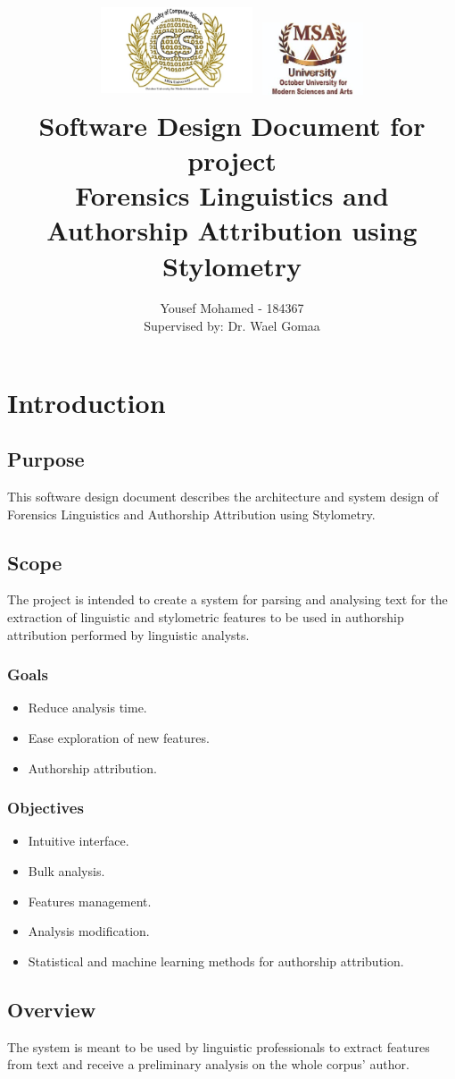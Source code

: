 \documentclass[12pt]{article}
\title{
{\includegraphics[width=4.5cm, height=3cm]{Images/CSLogo.jpg}
\includegraphics[width=3cm, height=2.5cm]{Images/MSALogo.jpg}}
\\
{Software Design Document for project \\ Forensics Linguistics and Authorship Attribution using Stylometry}
}
\date{}
\author{Yousef Mohamed - 184367 \\ Supervised by: Dr. Wael Gomaa}
\begin{document}
\maketitle

\section{Introduction}

\subsection{Purpose}
This software design document describes the architecture and system design of Forensics Linguistics and Authorship Attribution using Stylometry.


\subsection{Scope}
The project is intended to create a system for parsing and analysing text for the extraction of linguistic and stylometric features to be used in authorship attribution performed by linguistic analysts.

\subsubsection{Goals}
\begin{itemize}
  \item Reduce analysis time.
  \item Ease exploration of new features.
  \item Authorship attribution.
\end{itemize}

\subsubsection{Objectives}
\begin{itemize}
  \item Intuitive interface.
  \item Bulk analysis.
  \item Features management.
  \item Analysis modification.
  \item Statistical and machine learning methods for authorship attribution.
\end{itemize}

\subsection{Overview}
The system is meant to be used by linguistic professionals to extract features from text and receive a preliminary analysis on the whole corpus' author.
\end{document}
